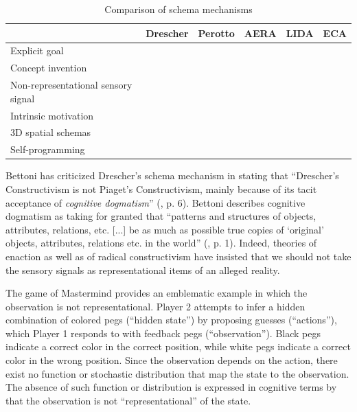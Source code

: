 \documentclass[runningheads]{llncs}
\begin{document}
\begin{table}
	\centering
	\caption{Comparison of schema mechanisms}\label{tab:comp}
	\begin{tabular}{|l|c|c|c|c|c|}
		\hline
		&  Drescher & Perotto & AERA & LIDA & ECA \\
		\hline
		Explicit goal & \checkmark & \checkmark & \checkmark & \checkmark &  \\
		Concept invention & \checkmark & \checkmark &  &  &  \\
		Non-representational sensory signal &  &  &  & \checkmark & \checkmark \\
		Intrinsic motivation &    &  &  & \checkmark & \checkmark \\
		3D spatial schemas &    &  &  & \checkmark & \checkmark \\
		Self-programming &    &  & &  & \checkmark \\
		\hline
	\end{tabular}
\end{table}



Bettoni  has criticized Drescher's schema mechanism in stating that ``Drescher's Constructivism is not Piaget's Constructivism, mainly because of its tacit acceptance of \textit{cognitive dogmatism}'' (\cite{bettoni_made-up_1993}, p. 6).
Bettoni describes cognitive dogmatism as taking for granted that ``patterns and structures of objects, attributes, relations, etc. [...] be as much as possible true copies of `original' objects, attributes, relations etc. in the world'' (\cite{bettoni_made-up_1993}, p. 1).
Indeed, theories of enaction as well as of radical constructivism have insisted that we should not take the sensory signals as representational items of an alleged reality. 


The game of Mastermind provides an emblematic example in which the observation is not representational. 
Player 2 attempts to infer a hidden combination of colored pegs (``hidden state'') by proposing guesses (``actions''), which Player 1 responds to with feedback pegs (``observation''). Black pegs indicate a correct color in the correct position, while white pegs indicate a correct color in the wrong position.
Since the observation depends on the action, there exist no function or stochastic distribution that map the state to the observation. 
The absence of such function or distribution is expressed in cognitive terms by that the observation is not ``representational'' of the state.
\end{document}
